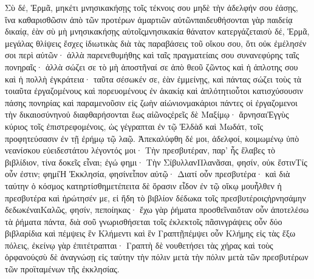 Σὺ δέ, Ἑρμᾶ, μηκέτι μνησικακήσῃς τοῖς τέκνοις σου μηδὲ τὴν ἀδελφήν σου ἐάσῃς, ἵνα καθαρισθῶσιν ἀπὸ τῶν προτέρων ἁμαρτιῶν αὐτῶνπαιδευθήσονται γὰρ παιδείᾳ δικαίᾳ, ἐὰν σὺ μὴ μνησικακήσῃς αὐτοῖςμνησικακία θάνατον κατεργάζεταισὺ δέ, Ἑρμᾶ, μεγάλας θλίψεις ἔσχες ἰδιωτικὰς διὰ τὰς παραβάσεις τοῦ οἴκου σου, ὅτι οὐκ ἐμέλησέν σοι περὶ αὐτῶν· ἀλλὰ παρενεθυμήθης καὶ ταῖς πραγματείαις σου συνανεφύρης ταῖς πονηραῖς· ἀλλὰ σώζει σε τὸ μὴ ἀποστῆναί σε ἀπὸ θεοῦ ζῶντος καὶ ἡ ἁπλοτης σου καὶ ἡ πολλὴ ἐγκράτεια· ταῦτα σέσωκέν σε, ἐὰν ἐμμείνῃς, καὶ πάντας σώζει τοὺς τὰ τοιαῦτα ἐργαζομένους καὶ πορευομένους ἐν ἀκακίᾳ καὶ ἁπλότητιοὗτοι κατισχύσουσιν πάσης πονηρίας καὶ παραμενοῦσιν εἰς ζωὴν αἰώνιονμακάριοι πάντες οἱ ἐργαζομενοι τὴν δικαιοσύνηνοὐ διαφθαρήσονται ἕως αἰῶνοςἐρεῖς δὲ Μαξίμῳ· ἄρνησαιἘγγὺς κύριος τοῖς ἐπιστρεφομένοις, ὡς γέγραπται ἐν τῷ Ἐλδὰδ καὶ Μωδάτ, τοῖς προφητεύσασιν ἐν τῇ ἐρήμῳ τῷ λαῷ.
Ἀπεκαλύφθη δέ μοι, ἀδελφοί, κοιμωμένῳ ὑπὸ νεανίσκου εὐειδεστάτου λέγοντός μοι· Τὴν πρεσβυτέραν, παρ’ ἧς ἔλαβες τὸ βιβλίδιον, τίνα δοκεῖς εἶναι; ἐγώ φημι· Τὴν ΣίβυλλανΠλανᾶσαι, φησίν, οὐκ ἔστινΤίς οὖν ἐστιν; φημίἩ Ἐκκλησία, φησίνεἶπον αὐτῷ· Διατί οὖν πρεσβυτέρα· καὶ διὰ ταύτην ὁ κόσμος κατηρτίσθημετέπειτα δὲ ὅρασιν εἶδον ἐν τῷ οἴκῳ μουἦλθεν ἡ πρεσβυτέρα καὶ ἠρώτησέν με, εἰ ἤδη τὸ βιβλίον δέδωκα τοῖς πρεσβυτέροιςἠρνησάμην δεδωκέναιΚαλῶς, φησίν, πεποίηκας· ἔχω γὰρ ῥήματα προσθεῖναιὅταν οὖν ἀποτελέσω τὰ ῥήματα πάντα, διὰ σοῦ γνωρισθήσεται τοῖς ἐκλεκτοῖς πᾶσινγράψεις οὖν δύο βιβλαρίδια καὶ πέμψεις ἓν Κλήμεντι καὶ ἓν Γραπτῇπέμψει οὖν Κλήμης εἰς τὰς ἔξω πόλεις, ἐκείνῳ γὰρ ἐπιτέτραπται· Γραπτὴ δὲ νουθετήσει τὰς χήρας καὶ τοὺς ὀρφανούςσὺ δὲ ἀναγνώσῃ εἰς ταύτην τὴν πόλιν μετὰ τὴν πόλιν μετὰ τῶν πρεσβυτέρων τῶν προϊταμένων τῆς ἐκκλησίας.

